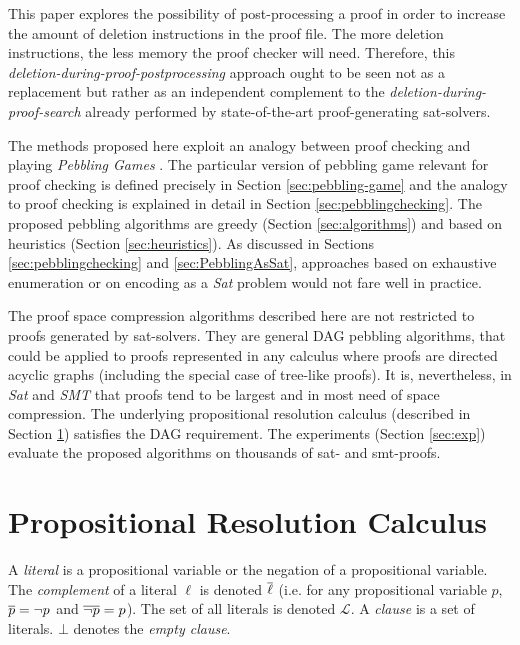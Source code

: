 \documentclass{llncs}
\begin{document}
This paper explores the possibility of post-processing a proof in order to increase the amount of deletion instructions in the proof file. The more deletion instructions, the less memory the proof checker will need. Therefore, this \emph{deletion-during-proof-postprocessing} approach ought to be seen not as a replacement but rather as an independent complement to the \emph{deletion-during-proof-search} already performed by state-of-the-art proof-generating sat-solvers.

The methods proposed here exploit an analogy between proof checking and 
playing \emph{Pebbling Games} \cite{kasai1979classes,gilbert1980pebbling}. 
The particular version of pebbling game relevant for proof checking is defined precisely in Section \ref{sec:pebbling-game} and the analogy to proof checking is explained in detail in Section \ref{sec:pebblingchecking}. The proposed pebbling algorithms are greedy (Section \ref{sec:algorithms}) and based on heuristics (Section \ref{sec:heuristics}). As discussed in Sections \ref{sec:pebblingchecking} and \ref{sec:PebblingAsSat}, approaches based on exhaustive enumeration or on encoding as a \emph{Sat} problem would not fare well in practice.

The proof space compression algorithms described here are not restricted to proofs generated by sat-solvers. They are general DAG pebbling algorithms, that could be applied to proofs represented in any calculus where proofs are directed acyclic graphs (including the special case of tree-like proofs). It is, nevertheless, in \emph{Sat} and \emph{SMT} that proofs tend to be largest and in most need of space compression. The underlying propositional resolution calculus (described in Section \ref{sec:Resolution}) satisfies the DAG requirement. The experiments (Section \ref{sec:exp}) evaluate the proposed algorithms on thousands of sat- and smt-proofs.


\section{Propositional Resolution Calculus}
\label{sec:Resolution}

A \emph{literal} is a propositional variable or the negation of a propositional variable. The
\emph{complement} of a literal $\ell$ is denoted $\overline{\ell}$ (i.e. for any propositional variable $p$,
$\overline{p} = \neg p$ and $\overline{\neg p} = p$). The set of all literals is denoted $\mathcal{L}$. A
\emph{clause} is a set of literals. $\bot$ denotes the \emph{empty clause}.
\end{document}
